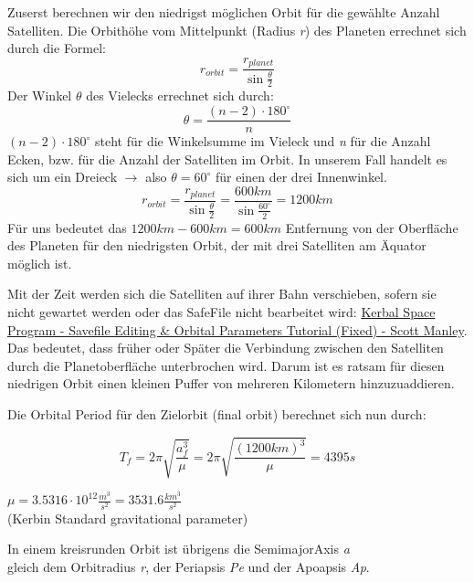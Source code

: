 \documentclass[12pt,paper=A4,numbers=noenddot,bibliography=totoc,listof=totoc,DIV=11,BCOR=1mm]{scrreprt}
\begin{document}
Zuserst berechnen wir den niedrigst möglichen Orbit für die gewählte Anzahl Satelliten.
Die Orbithöhe vom Mittelpunkt (Radius \emph{r}) des Planeten errechnet sich durch die Formel:
\begin{equation}
r_{orbit} = \frac{r_{planet}}{\sin \frac{\theta}{2}}
\end{equation}
Der Winkel $\theta$ des Vielecks errechnet sich durch:
\begin{equation}
\theta = \frac{(n-2) \cdot 180^{\circ}}{n}
\end{equation}
$(n-2) \cdot 180^{\circ}$ steht für die Winkelsumme im Vieleck und
\emph{n} für die Anzahl Ecken, bzw. für die Anzahl der Satelliten im Orbit.
In unserem Fall handelt es sich um ein Dreieck $\rightarrow$ also $\theta = 60^{\circ}$ für einen der drei Innenwinkel.
$$
r_{orbit} = \frac{r_{planet}}{\sin \frac{\theta}{2}} = \frac{600km}{\sin \frac{60^\circ}{2}} = 1200km
$$
Für uns bedeutet das $1200km - 600km = 600km$ Entfernung von der Oberfläche des Planeten für den niedrigsten Orbit, der mit drei Satelliten am Äquator möglich ist.

Mit der Zeit werden sich die Satelliten auf ihrer Bahn verschieben, sofern sie nicht gewartet werden oder das SafeFile nicht bearbeitet wird: \href{https://youtu.be/0wXVm3M2I2w}{Kerbal Space Program - Savefile Editing \& Orbital Parameters Tutorial (Fixed) - Scott Manley}.
Das bedeutet, dass früher oder Später die Verbindung zwischen den Satelliten durch die Planetoberfläche unterbrochen wird. Darum ist es ratsam für diesen niedrigen Orbit einen kleinen Puffer von mehreren Kilometern hinzuzuaddieren.

\medskip Die Orbital Period für den Zielorbit (final orbit) berechnet sich nun durch:

\begin{equation}
T_{f} = 2\pi \sqrt{\frac{a_{f}^{3}}{\mu}} = 2\pi \sqrt{\frac{(1200km)^{3}}{\mu}} = 4395s
\end{equation}

\begin{flushright}
$\mu = 3.5316 \cdot 10^{12} \frac{m^{3}}{s^{2}} = 3531.6 \frac{km^{3}}{s^{2}}$ \\
(Kerbin Standard gravitational parameter)
\end{flushright}
\begin{flushright}
In einem kreisrunden Orbit ist übrigens die SemimajorAxis \emph{a}\\ gleich dem Orbitradius \emph{r}, der Periapsis \emph{Pe} und der Apoapsis \emph{Ap}.
\end{flushright}
\end{document}
